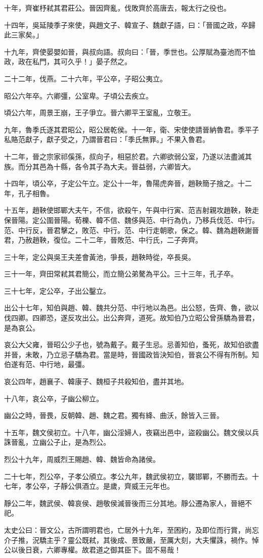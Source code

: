 \begin{pinyinscope}
十年，齊崔杼弒其君莊公。晉因齊亂，伐敗齊於高唐去，報太行之役也。

十四年，吳延陵季子來使，與趙文子、韓宣子、魏獻子語，曰：「晉國之政，卒歸此三家矣。」

十九年，齊使晏嬰如晉，與叔向語。叔向曰：「晉，季世也。公厚賦為臺池而不恤政，政在私門，其可久乎！」晏子然之。

二十二年，伐燕。二十六年，平公卒，子昭公夷立。

昭公六年卒。六卿彊，公室卑。子頃公去疾立。

頃公六年，周景王崩，王子爭立。晉六卿平王室亂，立敬王。

九年，魯季氏逐其君昭公，昭公居乾侯。十一年，衛、宋使使請晉納魯君。季平子私賂范獻子，獻子受之，乃謂晉君曰：「季氏無罪。」不果入魯君。

十二年，晉之宗家祁傒孫，叔向子，相惡於君。六卿欲弱公室，乃遂以法盡滅其族。而分其邑為十縣，各令其子為大夫。晉益弱，六卿皆大。

十四年，頃公卒，子定公午立。定公十一年，魯陽虎奔晉，趙鞅簡子捨之。十二年，孔子相魯。

十五年，趙鞅使邯鄲大夫午，不信，欲殺午，午與中行寅、范吉射親攻趙鞅，鞅走保晉陽。定公圍晉陽。荀櫟、韓不信、魏侈與范、中行為仇，乃移兵伐范、中行。范、中行反，晉君擊之，敗范、中行。范、中行走朝歌，保之。韓、魏為趙鞅謝晉君，乃赦趙鞅，復位。二十二年，晉敗范、中行氏，二子奔齊。

三十年，定公與吳王夫差會黃池，爭長，趙鞅時從，卒長吳。

三十一年，齊田常弒其君簡公，而立簡公弟驁為平公。三十三年，孔子卒。

三十七年，定公卒，子出公鑿立。

出公十七年，知伯與趙、韓、魏共分范、中行地以為邑。出公怒，告齊、魯，欲以伐四卿。四卿恐，遂反攻出公。出公奔齊，道死。故知伯乃立昭公曾孫驕為晉君，是為哀公。

哀公大父雍，晉昭公少子也，號為戴子。戴子生忌。忌善知伯，蚤死，故知伯欲盡并晉，未敢，乃立忌子驕為君。當是時，晉國政皆決知伯，晉哀公不得有所制。知伯遂有范、中行地，最彊。

哀公四年，趙襄子、韓康子、魏桓子共殺知伯，盡并其地。

十八年，哀公卒，子幽公柳立。

幽公之時，晉畏，反朝韓、趙、魏之君。獨有絳、曲沃，餘皆入三晉。

十五年，魏文侯初立。十八年，幽公淫婦人，夜竊出邑中，盜殺幽公。魏文侯以兵誅晉亂，立幽公子止，是為烈公。

烈公十九年，周威烈王賜趙、韓、魏皆命為諸侯。

二十七年，烈公卒，子孝公頎立。孝公九年，魏武侯初立，襲邯鄲，不勝而去。十七年，孝公卒，子靜公俱酒立。是歲，齊威王元年也。

靜公二年，魏武侯、韓哀侯、趙敬侯滅晉後而三分其地。靜公遷為家人，晉絕不祀。

太史公曰：晉文公，古所謂明君也，亡居外十九年，至困約，及即位而行賞，尚忘介子推，況驕主乎？靈公既弒，其後成、景致嚴，至厲大刻，大夫懼誅，禍作。悼公以後日衰，六卿專權。故君道之御其臣下。固不易哉！


\end{pinyinscope}